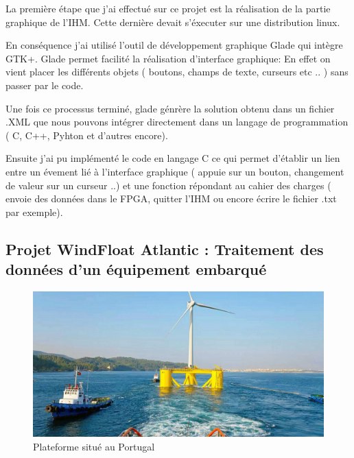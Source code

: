 
La première étape que j'ai effectué sur ce projet est la réalisation de la partie graphique de l'IHM. Cette dernière devait s'éxecuter sur une distribution linux.

En conséquence j'ai utilisé l'outil de développement graphique Glade qui intègre GTK+. Glade permet facilité la réalisation d'interface graphique: En effet on vient placer les différents objets ( boutons, champs de texte, curseurs etc .. ) sans passer par le code. 

Une fois ce processus terminé, glade génrère la solution obtenu dans un fichier .XML que nous pouvons intégrer directement dans un langage de programmation ( C, C++, Pyhton et d'autres encore). 
\newline


Ensuite j'ai pu implémenté le code en langage C ce qui permet d'établir un lien entre un évement lié à l'interface graphique ( appuie sur un bouton, changement de valeur sur un curseur ..) et une fonction répondant au cahier des charges ( envoie des données dans le FPGA, quitter l'IHM ou encore écrire le fichier .txt par exemple). 



\subsection{Projet WindFloat Atlantic : Traitement des données d'un équipement embarqué}

\begin{figure}[ht]
    \centering
    \includegraphics[scale=0.15]{img/WindFloatProject.jpeg}
    \caption{Plateforme situé au Portugal}
    \label{fig:CameraCmdsettings}
\end{figure}

